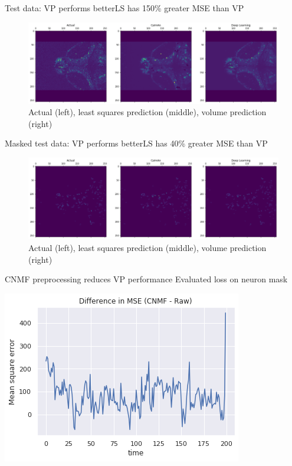 \begin{frame}{Test data: VP performs better}{LS has 150\% greater MSE than VP}
	\centering
	\begin{figure}
		\includegraphics[width=\textwidth]{media/test_mse}
		\caption{Actual (left), least squares prediction (middle), volume prediction (right)}
	\end{figure}

\end{frame}

\begin{frame}{Masked test data: VP performs better}{LS has 40\% greater MSE than VP}
	\centering
	\begin{figure}
		\includegraphics[width=\textwidth]{media/mask_mse}
		\caption{Actual (left), least squares prediction (middle), volume prediction (right)}
	\end{figure}
\end{frame}

\begin{frame}{ CNMF preprocessing reduces VP performance }{Evaluated loss on neuron mask}
	\begin{center}
		\includegraphics[height=0.7\textheight]{media/cnmf_pairwise.png}
	\end{center}
\end{frame}{}

